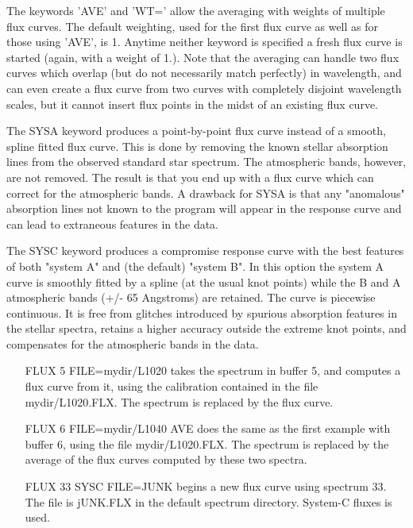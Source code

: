 The keywords 'AVE' and 'WT=' allow the averaging with weights of multiple
flux curves.  The default weighting, used for the first flux curve as well
as for those using 'AVE', is 1.  Anytime neither keyword is specified a
fresh flux curve is started (again, with a weight of 1.).  Note that the
averaging can handle two flux curves which overlap (but do not necessarily
match perfectly) in wavelength, and can even create a flux curve from two
curves with completely disjoint wavelength scales, but it cannot insert
flux points in the midst of an existing flux curve.

The SYSA keyword produces a point-by-point flux curve instead of a smooth,
spline fitted flux curve.  This is done by removing the known stellar
absorption lines from the observed standard star spectrum. The atmospheric
bands, however, are not removed.  The result is that you end up with a flux
curve which can correct for the atmospheric bands.  A drawback for SYSA is
that any "anomalous" absorption lines not known to the program will appear
in the response curve and can lead to extraneous features in the data.

The SYSC keyword produces a compromise response curve with the best
features of both "system A" and (the default) "system B".  In this option
the system A curve is smoothly fitted by a spline (at the usual knot
points) while the B and A atmospheric bands (+/- 65 Angstroms) are
retained.  The curve is piecewise continuous.  It is free from glitches
introduced by spurious absorption features in the stellar spectra, retains
a higher accuracy outside the extreme knot points, and compensates for the
atmospheric bands in the data.

\begin{itemize}
  \item[FLUX 5 FILE=mydir/L1020\hfill]{takes the spectrum in buffer 5, and
       computes a flux curve from it, using the calibration contained in
       the file mydir/L1020.FLX.  The spectrum is replaced by the flux
       curve.}

  \item[FLUX 6 FILE=mydir/L1040 AVE\hfill]{does the same as the first
       example with buffer 6, using the file mydir/L1020.FLX.  The spectrum
       is replaced by the average of the flux curves computed by these two
       spectra.}

  \item[FLUX 33 SYSC FILE=JUNK\hfill]{begins a new flux curve using
       spectrum 33.  The file is jUNK.FLX in the default spectrum
       directory.  System-C fluxes is used.}
\end{itemize}


